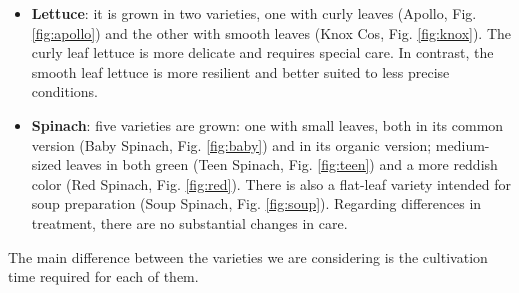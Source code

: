 \begin{itemize}
    \item \textbf{Lettuce}: it is grown in two varieties, one with curly leaves (Apollo, Fig. \ref{fig:apollo}) and the other with smooth leaves (Knox Cos, Fig. \ref{fig:knox}). The curly leaf lettuce is more delicate and requires special care. In contrast, the smooth leaf lettuce is more resilient and better suited to less precise conditions.
	\item \textbf{Spinach}: five varieties are grown: one with small leaves, both in its common version (Baby Spinach, Fig. \ref{fig:baby}) and in its organic version; medium-sized leaves in both green (Teen Spinach, Fig. \ref{fig:teen}) and a more reddish color (Red Spinach, Fig. \ref{fig:red}). There is also a flat-leaf variety intended for soup preparation (Soup Spinach, Fig. \ref{fig:soup}).
    Regarding differences in treatment, there are no substantial changes in care.
\end{itemize}
The main difference between the varieties we are considering is the cultivation time required for each of them.

